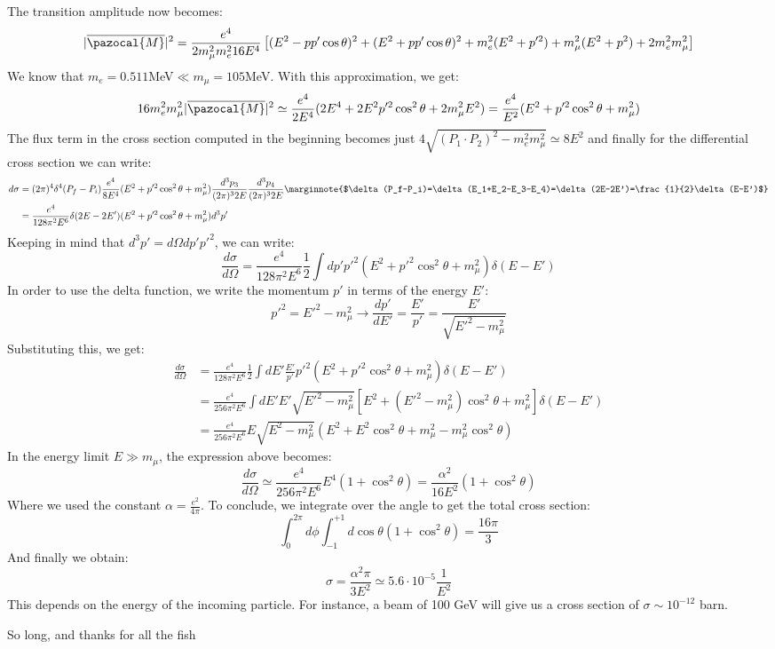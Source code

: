 \documentclass[../main.tex]{subfiles}
\begin{document}
The transition amplitude now becomes:
\[
|\overline{\pazocal{M}}|^2=\frac{e^4}{2m_\mu^2m_e^216E^4}\left[(E^2-pp'\cos\theta)^2+(E^2+pp'\cos\theta)^2+m_e^2(E^2+p'^2)+m_\mu^2(E^2+p^2)+2m_e^2m_\mu^2\right]
\]
We know that $m_e=0.511$MeV$\ll m_\mu=105$MeV. With this approximation, we get:
\[
16m_e^2m_\mu^2|\overline{\pazocal{M}}|^2\simeq\frac{e^4}{2E^4}(2E^4+2E^2p'^2\cos^2\theta+2m_\mu^2E^2)=\frac{e^4}{E^2}(E^2+p'^2\cos^2\theta+m_\mu^2)
\]
The flux term in the cross section computed in the beginning becomes just $4\sqrt{(P_1\cdot P_2)^2-m_e^2m_\mu^2}\simeq8E^2$ and finally for the differential cross section we can write:
\begin{align*}
d\sigma&=(2\pi)^4\delta^4(P_f-P_i)\frac{e^4}{8E^4}(E^2+p'^2\cos^2\theta+m_\mu^2)\frac{d^3p_3}{(2\pi)^32E}\frac{d^3p_4}{(2\pi)^32E}\marginnote{$\delta(P_f-P_i)=\delta(E_1+E_2-E_3-E_4)=\delta(2E-2E')=\frac{1}{2}\delta(E-E')$}\\
&=\frac{e^4}{128\pi^2E^6}\delta(2E-2E')(E^2+p'^2\cos^2\theta+m_\mu^2)d^3p'
\end{align*}
Keeping in mind that $d^3p'=d\Omega dp'p'^2$, we can write:
\[
\frac{d\sigma}{d\Omega}=\frac{e^4}{128\pi^2E^6}\frac{1}{2}\int dp'p'^2(E^2+p'^2\cos^2\theta+m_\mu^2)\delta(E-E')
\]
In order to use the delta function, we write the momentum $p'$ in terms of the energy $E'$:
\[
p'^2=E'^2-m_\mu^2\xrightarrow[]{}\frac{dp'}{dE'}=\frac{E'}{p'}=\frac{E'}{\sqrt{E'^2-m_\mu^2}}
\]
Substituting this, we get:
\begin{align*}
\frac{d\sigma}{d\Omega}&=\frac{e^4}{128\pi^2E^6}\frac{1}{2}\int dE'\frac{E'}{p'}p'^2(E^2+p'^2\cos^2\theta+m_\mu^2)\delta(E-E')\\
&=\frac{e^4}{256\pi^2E^6}\int dE'E'\sqrt{E'^2-m_\mu^2}[E^2+(E'^2-m_\mu^2)\cos^2\theta+m_\mu^2]\delta(E-E')\\
&=\frac{e^4}{256\pi^2E^6}E\sqrt{E^2-m_\mu^2}(E^2+E^2\cos^2\theta+m_\mu^2-m_\mu^2\cos^2\theta)
\end{align*}
In the energy limit $E\gg m_\mu$, the expression above becomes:
\[
\frac{d\sigma}{d\Omega}\simeq\frac{e^4}{256\pi^2E^6}E^4(1+\cos^2\theta)=\frac{\alpha^2}{16E^2}(1+\cos^2\theta)
\]
Where we used the constant $\alpha=\frac{e^2}{4\pi}$. To conclude, we integrate over the angle to get the total cross section:
\[
\int_0^{2\pi}d\phi\int_{-1}^{+1}d\cos\theta(1+\cos^2\theta)=\frac{16\pi}{3}
\]
And finally we obtain:
\[
\sigma=\frac{\alpha^2\pi}{3E^2}\simeq5.6\cdot10^{-5}\frac{1}{E^2}
\]
This depends on the energy of the incoming particle. For instance, a beam of 100 GeV will give us a cross section of $\sigma\sim10^{-12}$ barn.
\newpage
\vspace*{\fill}
\begin{center}
\begin{minipage}{\textwidth}
So long, and thanks for all the fish
\end{minipage}
\end{center}
\vfill %
\end{document}
